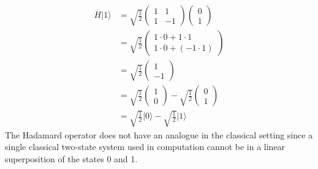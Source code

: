 \begin{align*}
	H\vert 1 \rangle &=
	\sqrt{\frac{1}{2}}
	\begin{pmatrix}
		1 & 1\\
		1 & -1
	\end{pmatrix}
	\begin{pmatrix}
		0\\
		1
	\end{pmatrix}\\
	&=
	\sqrt{\frac{1}{2}}
	\begin{pmatrix}
		1 \cdot 0 + 1 \cdot 1\\
		1 \cdot 0 + (-1 \cdot 1)
	\end{pmatrix}\\
	&=
	\sqrt{\frac{1}{2}}
	\begin{pmatrix}
		1\\
		-1
	\end{pmatrix}\\
	&=
	\sqrt{\frac{1}{2}}
	\begin{pmatrix}
		1\\
		0
	\end{pmatrix}
	-
	\sqrt{\frac{1}{2}}
	\begin{pmatrix}
		0\\
		1
	\end{pmatrix}\\
	&= 
	\sqrt{\frac{1}{2}} \vert 0 \rangle - \sqrt{\frac{1}{2}}\vert 1 \rangle
\end{align*}
The Hadamard operator does not have an analogue in the classical setting since a single classical two-state system used in computation cannot be in a linear superposition of the states 0 and 1.

